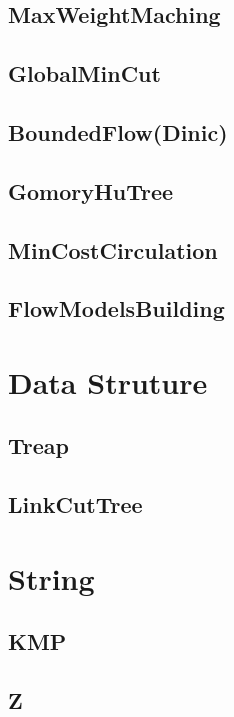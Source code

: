 	\subsection{MaxWeightMaching}
	
	\subsection{GlobalMinCut}
	
	\subsection{BoundedFlow(Dinic)}
	
	\subsection{GomoryHuTree}
	
	\subsection{MinCostCirculation}
	
	\subsection{FlowModelsBuilding}
	
\section{Data Struture}
	\subsection{Treap}
	
	\subsection{LinkCutTree}
	
\section{String}
	\subsection{KMP}
	
	\subsection{Z}
	
